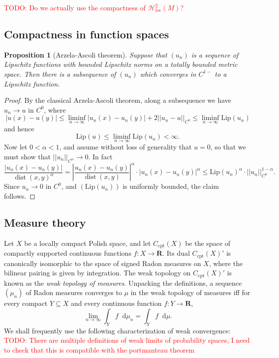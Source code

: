 \documentclass[reqno,11pt]{amsart}
\newcommand{\RR}{\mathbf{R}}
\newcommand*\dif{\mathop{}\!\mathrm{d}}
\DeclareMathOperator{\dist}{dist}
\newcommand{\Hypspace}{\mathscr H}
\newcommand{\Lip}{\mathrm{Lip}}
\newcommand{\dfn}[1]{\emph{#1}\index{#1}}
\newcommand{\loc}{\mathrm{loc}}
\newcommand{\cpt}{\mathrm{cpt}}
\newtheorem{proposition}[theorem]{Proposition}
\theoremstyle{definition}
\numberwithin{equation}{section}
\newcommand\todo[1]{\textcolor{red}{TODO: #1}}
\begin{document}
\todo{Do we actually use the compactness of $\Hypspace^2_\loc(M)$?}

\subsection{Compactness in function spaces}
\begin{proposition}[Arzela-Ascoli theorem]\label{AA Holder}
Suppose that $(u_n)$ is a sequence of Lipschitz functions with bounded Lipschitz norms on a totally bounded metric space. Then there is a subsequence of $(u_n)$ which converges in $C^{1-}$ to a Lipschitz function.
\end{proposition}
\begin{proof}
By the classical Arzela-Ascoli theorem, along a subsequence we have $u_n \to u$ in $C^0$, where
$$|u(x) - u(y)| \leq \liminf_{n \to \infty} |u_n(x) - u_n(y)| + 2 ||u_n - u||_{C^0} \leq \liminf_{n \to \infty} \Lip(u_n)$$
and hence
$$\Lip(u) \leq \liminf_{n \to \infty} \Lip(u_n) < \infty.$$
Now let $0 < \alpha < 1$, and assume without loss of generality that $u = 0$, so that we must show that $||u_n||_{C^\alpha} \to 0$.
In fact
$$\frac{|u_n(x) - u_n(y)|}{\dist(x, y)^\alpha} = \left|\frac{u_n(x) - u_n(y)}{\dist(x, y)}\right|^\alpha \cdot |u_n(x) - u_n(y)|^\alpha \leq \Lip(u_n)^\alpha \cdot ||u_n||_{C^0}^{1 - \alpha}.$$
Since $u_n \to 0$ in $C^0$, and $(\Lip(u_n))$ is uniformly bounded, the claim follows.
\end{proof}


\subsection{Measure theory}\label{MeasurePrelims}
Let $X$ be a locally compact Polish space, and let $C_\cpt(X)$ be the space of compactly supported continuous functions $f: X \to \RR$.
Its dual $C_\cpt(X)'$ is canonically isomorphic to the space of signed Radon measures on $X$, where the bilinear pairing is given by integration.
The weak topology on $C_\cpt(X)'$ is known as the \dfn{weak topology of measures}.
Unpacking the definitions, a sequence $(\mu_n)$ of Radon measures converges to $\mu$ in the weak topology of measures iff for every compact $Y \subseteq X$ and every continuous function $f: Y \to \RR$,
$$\lim_{n \to \infty} \int_Y f \dif \mu_n = \int_Y f \dif \mu.$$
We shall frequently use the following characterization of weak convergence:
\todo{There are multiple definitions of weak limits of probability spaces, I need to check that this is compatible with the portmanteau theorem}
\end{document}

